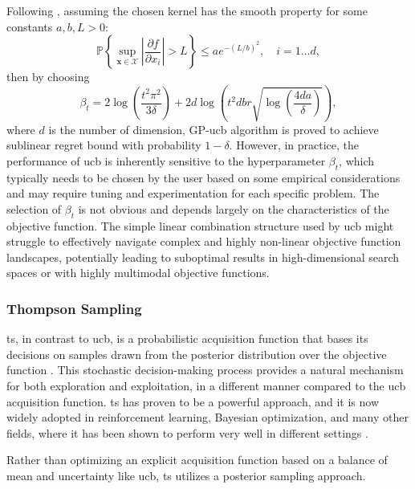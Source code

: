 Following \citep{srinivas2009gaussian}, assuming the chosen
kernel has the smooth property for some constants $a, b, L > 0$:
\[
\mathbb{P} \left\{ \sup_{\mathbf{x} \in \mathcal{X}} \left| \frac{\partial f}{\partial x_i} \right| > L \right\} \leq a e^{-(L/b)^2}, \quad i=1 \ldots d, 
\]
then by choosing
\[
\beta_t = 2 \log \left( \frac{t^2 \pi^2}{3\delta} \right) + 2d \log \left( t^2 dbr \sqrt{\log \left( \frac{4da}{\delta} \right) } \right),
\]
where $d$ is the number of dimension, GP-\ac{ucb} algorithm is proved to achieve sublinear regret bound with probability $1 - \delta$. However, in practice, the performance of \ac{ucb} is inherently sensitive to the hyperparameter \(\beta_t\), which typically needs to be chosen by the user based on some empirical considerations and may require tuning and experimentation for each specific problem. The selection of \(\beta_t\) is not obvious and depends largely on the characteristics of the objective function. 
The simple linear combination structure used by \ac{ucb} might struggle to effectively navigate complex and highly non-linear objective function landscapes, potentially leading to suboptimal results in high-dimensional search spaces or with highly multimodal objective functions.

\subsubsection{Thompson Sampling}
\label{section:thompson_sampling}

\acf{ts}, in contrast to \ac{ucb}, is a probabilistic acquisition function that bases its decisions on samples drawn from the posterior distribution over the objective function \citep{thompson1933likelihood, russo2018tutorial}. This stochastic decision-making process provides a natural mechanism for both exploration and exploitation, in a different manner compared to the \ac{ucb} acquisition function. \ac{ts} has proven to be a powerful approach, and it is now widely adopted in reinforcement learning, Bayesian optimization, and many other fields, where it has been shown to perform very well in different settings \citep{agrawal2017thompson, chowdhury2017kernelized}.

Rather than optimizing an explicit acquisition function based on a balance of mean and uncertainty like \ac{ucb}, \ac{ts} utilizes a posterior sampling approach. 

